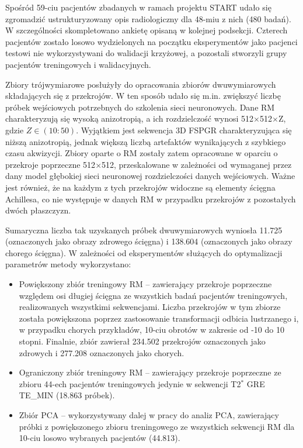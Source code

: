 Spośród 59-ciu pacjentów zbadanych w ramach projektu START udało się zgromadzić ustrukturyzowany opis radiologiczny dla 48-miu z nich (480 badań). \linebreak W szczególności skompletowano ankietę opisaną w kolejnej podsekcji. Czterech pacjentów zostało losowo wydzielonych na początku eksperymentów jako pacjenci testowi nie wykorzystywani do walidacji krzyżowej, a pozostali stworzyli grupy pacjentów treningowych i walidacyjnych.

Zbiory trójwymiarowe posłużyły do opracowania zbiorów dwuwymiarowych składających się z przekrojów. W ten sposób udało się m.in. zwiększyć liczbę próbek wejściowych potrzebnych do szkolenia sieci neuronowych. Dane RM charakteryzują się wysoką anizotropią, a ich rozdzielczość wynosi 512$\times$512$\times$Z, gdzie $Z\in(10:50)$. Wyjątkiem jest sekwencja 3D FSPGR charakteryzująca się niższą anizotropią, jednak większą liczbą artefaktów wynikających z szybkiego czasu akwizycji. Zbiory oparte o RM zostały zatem opracowane w oparciu o przekroje poprzeczne 512$\times$512, przeskalowane w zależności od wymaganej przez dany model głębokiej sieci neuronowej rozdzielczości danych wejściowych. Ważne jest również, że na każdym z tych przekrojów widoczne są elementy ścięgna Achillesa, co nie występuje w danych RM w przypadku przekrojów z pozostałych dwóch płaszczyzn.

Sumaryczna liczba tak uzyskanych próbek dwuwymiarowych wyniosła 11.725 (oznaczonych jako obrazy zdrowego ścięgna) i 138.604 (oznaczonych jako obrazy chorego ścięgna). W zależności od eksperymentów służących do optymalizacji parametrów metody wykorzystano:
\begin{itemize}[noitemsep,nolistsep]
	\item Powiększony zbiór treningowy RM -- zawierający przekroje poprzeczne względem osi długiej ścięgna ze wszystkich badań pacjentów treningowych, realizowanych wszystkimi sekwencjami. Liczba przekrojów w tym zbiorze została powiększona poprzez zastosowanie transformacji odbicia lustrzanego i, w przypadku chorych przykładów, 10-ciu obrotów w zakresie od -10 do 10 stopni. Finalnie, zbiór zawierał 234.502 przekrojów oznaczonych jako zdrowych i 277.208 oznaczonych jako chorych.
	\item Ograniczony zbiór treningowy RM -- zawierający przekroje poprzeczne ze zbioru 44-ech pacjentów treningowych jedynie w sekwencji T2$^\ast$ GRE TE\_MIN (18.863 próbek).
	\item Zbiór PCA -- wykorzystywany dalej w pracy do analiz PCA, zawierający próbki z powiększonego zbioru treningowego ze wszystkich sekwencji RM dla 10-ciu losowo wybranych pacjentów (44.813).
\end{itemize}

